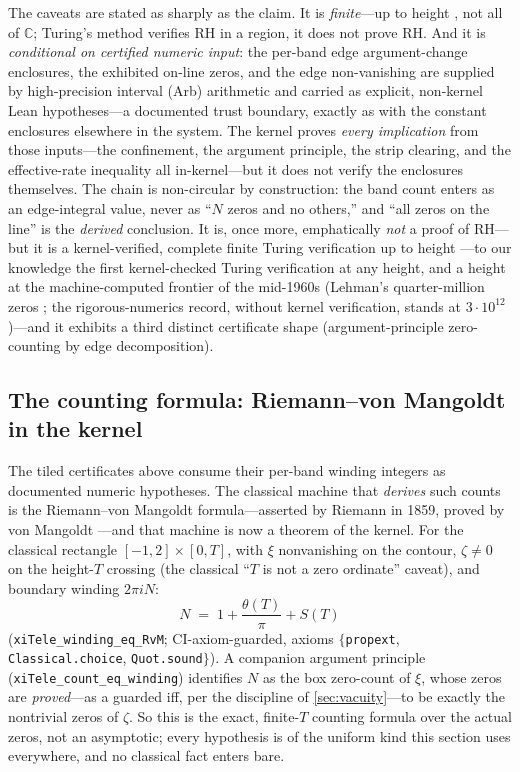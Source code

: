 The caveats are stated as sharply as the claim. It is \emph{finite}---up to height
\ladderHeight{}, not all of $\mathbb{C}$; Turing's method verifies RH in a region, it does
not prove RH. And it is \emph{conditional on certified numeric input}: the
per-band edge argument-change enclosures, the exhibited on-line zeros, and the
edge non-vanishing are supplied by high-precision interval (Arb) arithmetic and
carried as explicit, non-kernel Lean hypotheses---a documented trust boundary,
exactly as with the constant enclosures elsewhere in the system. The kernel proves
\emph{every implication} from those inputs---the confinement, the argument
principle, the strip clearing, and the effective-rate inequality all
in-kernel---but it does not verify the enclosures themselves. The chain is non-circular by construction: the band
count enters as an edge-integral value, never as ``$N$ zeros and no others,'' and
``all zeros on the line'' is the \emph{derived} conclusion. It is, once more,
emphatically \emph{not} a proof of RH---but it is a kernel-verified, complete finite
Turing verification up to height \ladderHeight{} \cite{turing1953}---to our
knowledge the first kernel-checked Turing verification at any height, and a
height at the machine-computed frontier of the mid-1960s (Lehman's
quarter-million zeros \cite{lehman1966}; the rigorous-numerics record, without
kernel verification, stands at $3\cdot10^{12}$
\cite{platttrudgian2021})---and it exhibits a third distinct certificate shape
(argument-principle zero-counting by edge decomposition).

\subsection{The counting formula: Riemann--von Mangoldt in the kernel}

The tiled certificates above consume their per-band winding integers as
documented numeric hypotheses. The classical machine that \emph{derives} such
counts is the Riemann--von Mangoldt formula---asserted by Riemann in 1859,
proved by von Mangoldt \cite{vonmangoldt1895}---and that machine is now a
theorem of the kernel. For the classical rectangle $[-1,2] \times [0,T]$, with
$\xi$ nonvanishing on the contour, $\zeta \ne 0$ on the height-$T$ crossing
(the classical ``$T$ is not a zero ordinate'' caveat), and boundary winding
$2\pi i N$:
\[
  N \;=\; 1 + \frac{\theta(T)}{\pi} + S(T)
\]
(\texttt{xiTele\_winding\_eq\_RvM}; CI-axiom-guarded, axioms
$\{$\texttt{propext}, \texttt{Classical.choice}, \texttt{Quot.sound}$\}$). A
companion argument principle (\texttt{xiTele\_count\_eq\_winding}) identifies
$N$ as the box zero-count of $\xi$, whose zeros are \emph{proved}---as a
guarded iff, per the discipline of \cref{sec:vacuity}---to be exactly the
nontrivial zeros of $\zeta$. So this is the exact, finite-$T$ counting formula
over the actual zeros, not an asymptotic; every hypothesis is of the uniform
kind this section uses everywhere, and no classical fact enters bare.

